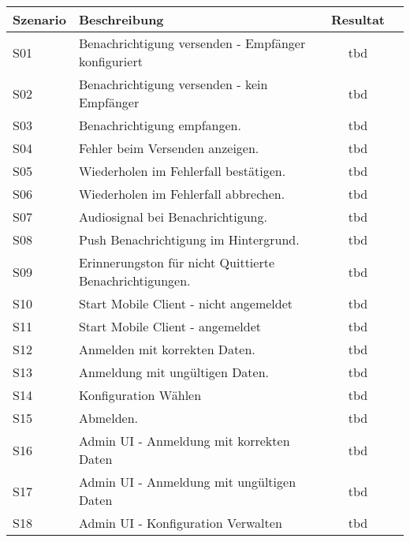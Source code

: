 \begin{table}[h]
    \centering
    \begin{tabular}{|l|p{11cm}|c|c|}
        \hline
        \textbf{Szenario} & \textbf{Beschreibung}                                                                                                                                  & \textbf{Resultat} \\
        \hline
        S01         & Benachrichtigung versenden - Empfänger konfiguriert   & tbd\\
        \hline
        S02         & Benachrichtigung versenden - kein Empfänger & tbd\\
        \hline
        S03         & Benachrichtigung empfangen.  & tbd\\
        \hline
        S04         & Fehler beim Versenden anzeigen.  & tbd\\
        \hline
        S05         & Wiederholen im Fehlerfall bestätigen.  & tbd\\
        \hline
        S06         & Wiederholen im Fehlerfall abbrechen.  & tbd\\
        \hline
        S07         & Audiosignal bei Benachrichtigung.   & tbd\\
        \hline
        S08         & Push Benachrichtigung im Hintergrund.  & tbd\\
        \hline
        S09         & Erinnerungston für nicht Quittierte Benachrichtigungen.   & tbd\\
        \hline
        S10         & Start Mobile Client - nicht angemeldet   & tbd\\
        \hline
        S11         & Start Mobile Client  - angemeldet & tbd\\
        \hline
        S12         & Anmelden mit korrekten Daten.   & tbd\\
        \hline
        S13         & Anmeldung mit ungültigen Daten.   & tbd\\
        \hline
        S14         & Konfiguration Wählen   & tbd\\
        \hline
        S15         & Abmelden.   & tbd\\
        \hline
        S16         & Admin UI - Anmeldung mit korrekten Daten   & tbd\\
        \hline
        S17         & Admin UI - Anmeldung mit ungültigen Daten   & tbd\\
        \hline
        S18         & Admin UI - Konfiguration Verwalten   & tbd\\
        \hline
    \end{tabular}\label{tab:testplan_migration}
\end{table}
\clearpage

